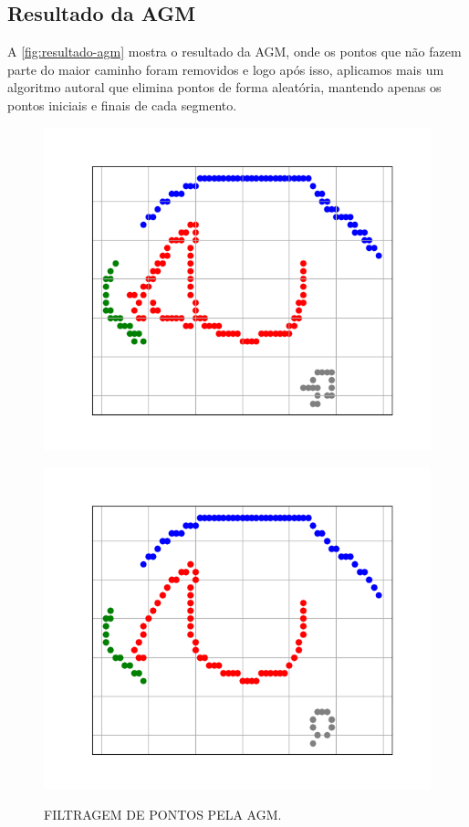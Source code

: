 \subsection{Resultado da AGM}
\label{sec:resultado-agm}

A \autoref{fig:resultado-agm} mostra o resultado da AGM, onde os pontos que não fazem parte do maior caminho foram removidos e logo após isso, aplicamos mais um algoritmo autoral que elimina pontos de forma aleatória, mantendo apenas os pontos iniciais e finais de cada segmento.

\begin{figure}[h!]
    \caption{FILTRAGEM DE PONTOS PELA AGM.}
    \centering
    \begin{minipage}[b]{0.45\textwidth}
        \centering
        \includegraphics[width=0.9\linewidth]{fig/04_connected_components_right_eye.png}
        \label{fig:olho-grafo}
    \end{minipage}
    \hfill
    \begin{minipage}[b]{0.45\textwidth}
        \centering
        \includegraphics[width=0.9\linewidth]{fig/05_longest_path_right_eye.png}
        \label{fig:olho-agm}
    \end{minipage}


\end{figure}
